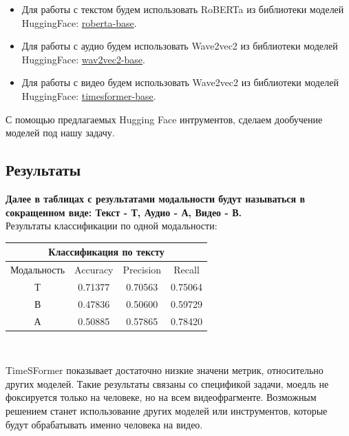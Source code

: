 \documentclass[PMI,VKR]{HSEUniversity}
\begin{document}
\begin{itemize}
    \item Для работы с текстом будем использовать RoBERTa из библиотеки моделей HuggingFace: \href{https://huggingface.co/roberta-base}{roberta-base}.
    \item Для работы с аудио будем использовать Wave2vec2 из библиотеки моделей HuggingFace: \href{https://huggingface.co/facebook/wav2vec2-base}{wav2vec2-base}.
    \item Для работы с видео будем использовать Wave2vec2 из библиотеки моделей HuggingFace: \href{https://huggingface.co/facebook/timesformer-base-finetuned-k400}{timesformer-base}.
\end{itemize}

С помощью предлагаемых Hugging Face интрументов, сделаем дообучение моделей под нашу задачу. \\

\subsection{Результаты}

\textbf{Далее в таблицах с результатами модальности будут называться в сокращенном виде: Текст - Т, Аудио - А, Видео - В.} \\

Результаты классификации по одной модальности: \\

\begin{center}
    \begin{tabular}{ |c||c|c|c|}
        \hline
        \multicolumn{4}{|c|}{Классификация по тексту} \\
        \hline
        Модальность & Accuracy & Precision & Recall   \\
        \hline
        Т           & 0.71377  & 0.70563   & 0.75064  \\
        В           & 0.47836  & 0.50600   & 0.59729  \\
        А           & 0.50885  & 0.57865   & 0.78420  \\
        \hline
    \end{tabular} \\
\end{center}



TimeSFormer показывает достаточно низкие значени метрик, относительно других моделей. Такие результаты связаны со спецификой задачи, моедль не фоксируется только на человеке, но на всем видеофрагменте. Возможным решением станет использование других моделей или инструментов, которые будут обрабатывать именно человека на видео.
\end{document}

